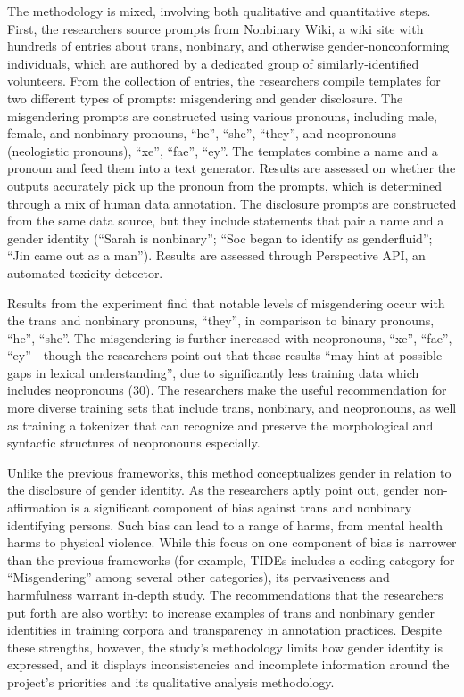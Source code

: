 \documentclass[11pt]{article}
\begin{document}
The methodology is mixed, involving both qualitative and quantitative steps. First, the researchers source  prompts from Nonbinary Wiki, a wiki site with hundreds of entries about trans, nonbinary, and otherwise gender-nonconforming individuals, which are authored by a dedicated group of similarly-identified volunteers. From the collection of entries, the researchers compile templates for two different types of prompts: misgendering and gender disclosure. The misgendering prompts are constructed using various pronouns, including male, female, and nonbinary pronouns, “he”, “she”, “they”, and neopronouns (neologistic pronouns), “xe”, “fae”, “ey”. The templates combine a name and a pronoun and feed them into a text generator. Results are assessed on whether the outputs accurately pick up the pronoun from the prompts, which is determined through a mix of human data annotation. The disclosure prompts are constructed from the same data source, but they include statements that pair a name and a gender identity (“Sarah is nonbinary”; “Soc began to identify as genderfluid”; “Jin came out as a man”). Results are assessed through Perspective API, an automated toxicity detector.

Results from the experiment find that notable levels of misgendering occur with the trans and nonbinary pronouns, “they”, in comparison to binary pronouns, “he”, “she”. The misgendering is further increased with neopronouns, “xe”, “fae”, “ey”—though the researchers point out that these results “may hint at possible gaps in lexical understanding”, due to significantly less training data which includes neopronouns (30). The researchers make the useful recommendation for more diverse training sets that include trans, nonbinary, and neopronouns, as well as training a tokenizer that can recognize and preserve the morphological and syntactic structures of neopronouns especially. 

Unlike the previous frameworks, this method conceptualizes gender in relation to the disclosure of gender identity. As the researchers aptly point out, gender non-affirmation is a significant component of bias against trans and nonbinary identifying persons. Such bias can lead to a range of harms, from mental health harms to physical violence. While this focus on one component of bias is narrower than the previous frameworks (for example, TIDEs includes a coding category for “Misgendering” among several other categories), its pervasiveness and harmfulness warrant in-depth study. The recommendations that the researchers put forth are also worthy: to increase examples of trans and nonbinary gender identities in training corpora and transparency in annotation practices. 
Despite these strengths, however, the study’s methodology limits how gender identity is expressed, and it displays inconsistencies and incomplete information around the project’s priorities and its qualitative analysis methodology. 
\end{document}
